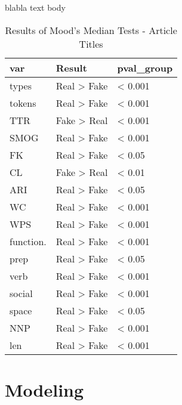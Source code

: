 \documentclass[../thesis.tex]{subfiles}
\begin{document}
blabla text body

\begin{longtable}[t]{lll}
\caption{\label{tab:}Results of Mood's Median Tests - Article Titles}\\
\toprule
var & Result & pval\_group\\
\midrule
types & Real > Fake & < 0.001\\
tokens & Real > Fake & < 0.001\\
TTR & Fake > Real & < 0.001\\
SMOG & Real > Fake & < 0.001\\
FK & Real > Fake & < 0.05\\
\addlinespace
CL & Fake > Real & < 0.01\\
ARI & Real > Fake & < 0.05\\
WC & Real > Fake & < 0.001\\
WPS & Real > Fake & < 0.001\\
function. & Real > Fake & < 0.001\\
\addlinespace
prep & Real > Fake & < 0.05\\
verb & Real > Fake & < 0.001\\
social & Real > Fake & < 0.001\\
space & Real > Fake & < 0.05\\
NNP & Real > Fake & < 0.001\\
\addlinespace
len & Real > Fake & < 0.001\\
\bottomrule
\end{longtable}

\section{Modeling}
\end{document}

